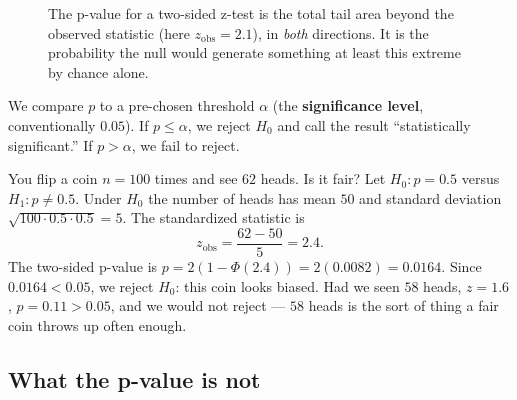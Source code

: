 \begin{figure}[H]
\centering
{}
\caption{The p-value for a two-sided z-test is the total tail area beyond the observed
statistic (here $z_{\text{obs}}=2.1$), in \emph{both} directions. It is the probability
the null would generate something at least this extreme by chance alone.}
\label{ch32:fig-pvalue}
\end{figure}

We compare $p$ to a pre-chosen threshold $\alpha$ (the \textbf{significance level},
conventionally $0.05$). If $p \le \alpha$, we reject $H_0$ and call the result
``statistically significant.'' If $p > \alpha$, we fail to reject.

\begin{example}
\label{ch32:ex-coin}
You flip a coin $n=100$ times and see $62$ heads. Is it fair? Let $H_0\!: p = 0.5$ versus
$H_1\!: p \ne 0.5$. Under $H_0$ the number of heads has mean $50$ and standard deviation
$\sqrt{100 \cdot 0.5 \cdot 0.5}=5$. The standardized statistic is
\[
  z_{\text{obs}} = \frac{62 - 50}{5} = 2.4.
\]
The two-sided p-value is $p = 2(1-\Phi(2.4)) = 2(0.0082) = 0.0164$. Since $0.0164 <
0.05$, we reject $H_0$: this coin looks biased. Had we seen $58$ heads, $z = 1.6$,
$p = 0.11 > 0.05$, and we would not reject --- $58$ heads is the sort of thing a fair
coin throws up often enough.
\end{example}

\subsection{What the p-value is not}

